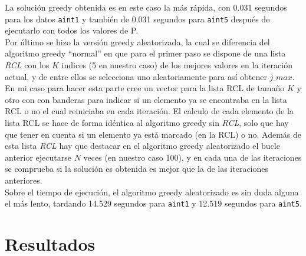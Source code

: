 \documentclass[a4paper,11pt]{article}
\begin{document}
La solución greedy obtenida es en este caso la más rápida, con 0.031 segundos para los datos \texttt{aint1} y también de 0.031 segundos para \texttt{aint5} después de ejecutarlo con todos los valores de P.\\

Por último se hizo la versión greedy aleatorizada, la cual se diferencia del algoritmo greedy ``normal'' en que para el primer paso se dispone de una lista \textit{RCL} con los ${K}$ indices (5 en nuestro caso) de los mejores valores en la iteración actual, y de entre ellos se selecciona uno aleatoriamente para así obtener ${j\_max}$. En mi caso para hacer esta parte cree un vector para la lista RCL de tamaño ${K}$ y otro con con banderas para indicar si un elemento ya se encontraba en la lista RCL o no el cual reiniciaba en cada iteración. El calculo de cada elemento de la lista RCL se hace de forma idéntica al algoritmo greedy sin \textit{RCL}, solo que hay que tener en cuenta si un elemento ya está marcado (en la RCL) o no. Además de esta lista \textit{RCL} hay que destacar en el algoritmo greedy aleatorizado el bucle anterior ejecutarse ${N}$ veces (en nuestro caso 100), y en cada una de las iteraciones se comprueba si la solución es obtenida es mejor que la de las iteraciones anteriores.\\

Sobre el tiempo de ejecución, el algoritmo greedy aleatorizado es sin duda alguna el más lento, tardando 14.529 segundos para \texttt{aint1} y 12.519 segundos para \texttt{aint5}.

\section{Resultados}
\end{document}
